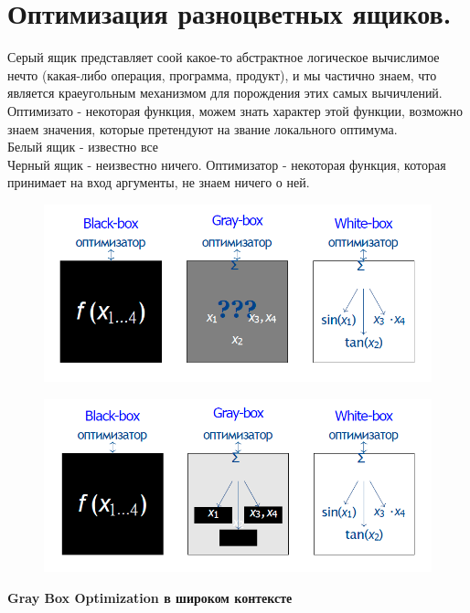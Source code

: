 \section{Оптимизация разноцветных ящиков.}
Серый ящик представляет соой какое-то абстрактное логическое вычислимое нечто (какая-либо операция, программа, продукт), и мы частично знаем, что является краеугольным механизмом для порождения этих самых вычичлений. Оптимизато - некоторая функция, можем знать характер этой функции, возможно знаем значения, которые претендуют на звание локального оптимума.\\
Белый ящик - известно все\\
Черный ящик - неизвестно ничего. Оптимизатор - некоторая функция, которая принимает на вход аргументы, не знаем ничего о ней.\\
\begin{figure}[h]
\centering
\includegraphics[width=0.8\linewidth]{images/colorbox.PNG}
\end{figure}
\begin{figure}[h]
\centering
\includegraphics[width=0.8\linewidth]{images/colorbox2.PNG}
\end{figure}
\textbf{Gray Box Optimization в широком контексте}
